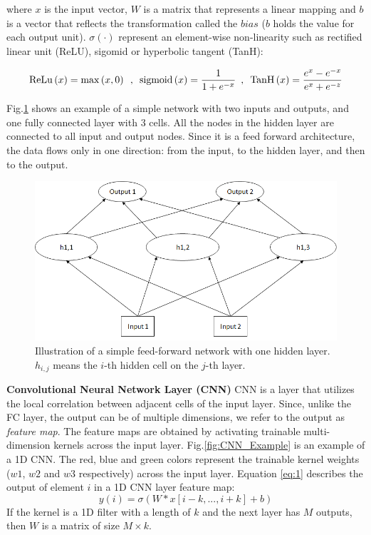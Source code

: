 \documentclass[
12pt, %
english, %
doublespacing, %
headsepline, %
]{MastersDoctoralThesis} %
\begin{document}
where $x$ is the input vector, $W$ is a matrix that represents a linear mapping and $b$ is a vector that reflects the transformation called the $bias$ ($b$ holds the value for each output unit). $\sigma \left( \cdot \right)$ represent an element-wise non-linearity such as rectified linear unit (ReLU), sigomid or hyperbolic tangent (TanH):

\[{\rm{ReLu}}\left( x \right) = \max \left( {x,0} \right) \,\,\,,\,\,\,{\rm{sigmoid}}\left( x \right) = \frac{1}{{1 + {e^{ - x}}}}\,\,\,,\,\,\,{\mathop{\rm Tan}\nolimits} {\rm{H}}\left( x \right) = \frac{{{e^x} - {e^{ - x}}}}{{{e^x} + {e^{ - z}}}}\]

Fig.\ref{fig:FF_Example} shows an example of a simple network with two inputs and outputs, and one fully connected layer with 3 cells. All the nodes in the hidden layer are connected to all input and output nodes. Since it is a feed forward architecture, the data flows only in one direction: from the input, to the hidden layer, and then to the output.

\begin{figure}
\centering
\includegraphics[width=0.7\linewidth]{Figures/FF_Example_v2}
\caption{Illustration of a simple feed-forward network with one hidden layer. $h_{i,j}$ means the $i$-th hidden cell on the $j$-th layer. }
\label{fig:FF_Example}
\end{figure}

\textbf{Convolutional Neural Network Layer (CNN) } CNN is a layer that utilizes the local correlation between adjacent cells of the input layer. Since, unlike the FC layer, the output can be of multiple dimensions, we refer to the output as \textit{feature map}. The feature maps are obtained by activating trainable multi-dimension kernels across the input layer. Fig.\ref{fig:CNN_Example} is an example of a 1D CNN. The red, blue and green colors represent the trainable kernel weights ($w1$, $w2$ and $w3$ respectively) across the input layer. Equation \ref{eq:1} describes the output of element $i$ in a 1D CNN layer feature map:
\begin{equation} \label{eq:1}
y\left( i \right) = \sigma \left( {W * x\left[ {i - k,...,i + k} \right] + b} \right)
\end{equation}
If the kernel is a 1D filter with a length of $k$ and the next layer has $M$ outputs, then $W$ is a matrix of size $M \times k$.
\end{document}
